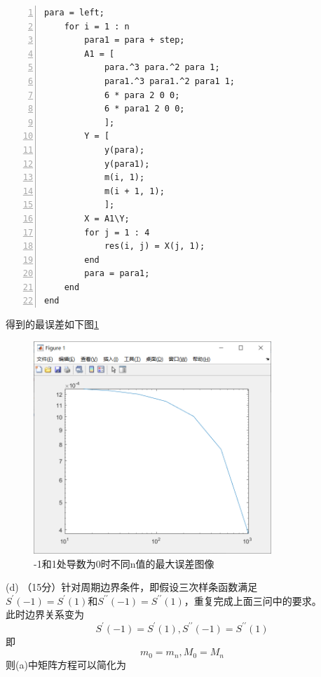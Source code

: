 \documentclass[12pt,a4paper,UTF8]{ctexart}
\begin{document}
\begin{enumerate}
\begin{lstlisting}[frame=signle,numbers=left]
    para = left;
    for i = 1 : n
        para1 = para + step;
        A1 = [
            para.^3 para.^2 para 1;
            para1.^3 para1.^2 para1 1;
            6 * para 2 0 0;
            6 * para1 2 0 0;
            ];
        Y = [
            y(para);
            y(para1);
            m(i, 1);
            m(i + 1, 1);
            ];
        X = A1\Y;
        for j = 1 : 4
            res(i, j) = X(j, 1);
        end
        para = para1;
    end
end
\end{lstlisting}

		得到的最误差如下图\ref{jpg:2}\\
	\begin{figure}[H]
		\centering
     	\includegraphics[width=0.8\textwidth]{2.png}
    	\caption{-1和1处导数为0时不同n值的最大误差图像}\label{jpg:2}
	\end{figure}

	(d) （15分）针对周期边界条件，即假设三次样条函数满足$S^{\prime }(-1) = S^{\prime}(1)和S^{\prime \prime}(−1) =S^{\prime \prime}(1)$，重复完成上面三问中的要求。\\

	此时边界关系变为$$S^{\prime }(-1) = S^{\prime}(1),S^{\prime \prime}(−1) =S^{\prime \prime}(1)$$
	即$$m_0=m_n,M_0=M_n$$
	则(a)中矩阵方程可以简化为
	

\end{enumerate}
\end{document}
